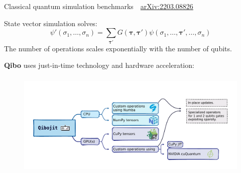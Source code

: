 \documentclass[aspectratio=169, 8pt, xcolor={svgnames}, hyperref={linkcolor=black}]{beamer}
\begin{document}
\begin{frame}{Classical quantum simulation benchmarks \hfill \faBook\,\, \href{https://arxiv.org/abs/2203.08826}{arXiv:2203.08826}}

   State vector simulation solves:
   \begin{equation*}
     \psi' (\sigma_1,\ldots,\sigma_n) = \sum_{\boldsymbol \tau'} G({\boldsymbol \tau},{\boldsymbol \tau}') \psi(\sigma_1,\ldots,{\boldsymbol \tau}',\ldots,\sigma_n)
   \end{equation*}
   The number of operations scales {\color{magenta} exponentially} with the number of qubits.

   \textbf{Qibo} uses just-in-time technology and hardware acceleration:
   \vspace{-0.35cm}
   \begin{figure}
     \includegraphics[height=5cm]{figures/qibojit.pdf}
   \end{figure}

 \end{frame}
\end{document}
